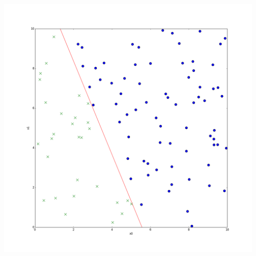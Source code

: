 \begin{frame}
  \begin{center}
    \includegraphics[scale=0.2]{./pictures/logreg_db078.png}
  \end{center}
\end{frame}


